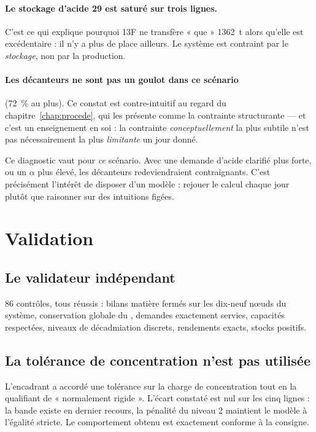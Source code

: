 \paragraph{Le stockage d'acide 29 est saturé sur trois lignes.} C'est ce qui explique
pourquoi 13F ne transfère « que » \SI{1362}{\tonne} alors qu'elle est excédentaire : il n'y
a plus de place ailleurs. Le système est contraint par le \emph{stockage}, non par la
production.

\paragraph{Les décanteurs ne sont pas un goulot dans ce scénario} (\SI{72}{\percent} au
plus). Ce constat est contre-intuitif au regard du chapitre~\ref{chap:procede}, qui les
présente comme la contrainte structurante --- et c'est un enseignement en soi : la contrainte
\emph{conceptuellement} la plus subtile n'est pas nécessairement la plus \emph{limitante} un
jour donné.

\begin{alerte}[title={Ne pas généraliser}]
Ce diagnostic vaut pour \emph{ce} scénario. Avec une demande d'acide clarifié plus forte, ou
un $\alpha$ plus élevé, les décanteurs redeviendraient contraignants. C'est précisément
l'intérêt de disposer d'un modèle : rejouer le calcul chaque jour plutôt que raisonner sur
des intuitions figées.
\end{alerte}

\section{Validation}

\subsection{Le validateur indépendant}

\num{86} contrôles, tous réussis : bilans matière fermés sur les dix-neuf n\oe uds du
système, conservation globale du \PdeuxOcinq{}, demandes exactement servies, capacités
respectées, niveaux de décadmiation discrets, rendements exacts, stocks positifs.

\subsection{La tolérance de concentration n'est pas utilisée}

L'encadrant a accordé une tolérance sur la charge de concentration tout en la qualifiant de
« normalement rigide ». L'écart constaté est nul sur les cinq lignes : la bande existe en
dernier recours, la pénalité du niveau 2 maintient le modèle à l'égalité stricte. Le
comportement obtenu est exactement conforme à la consigne.

